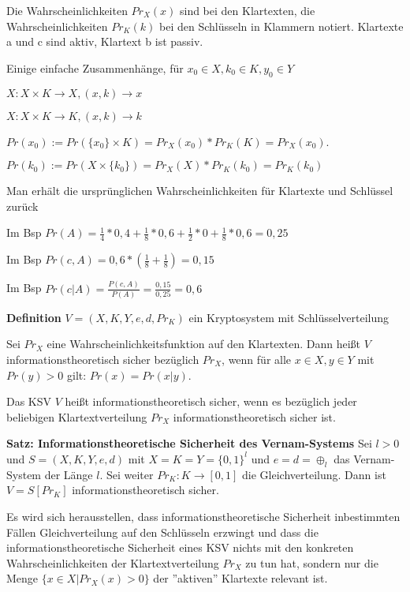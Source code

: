 \documentclass[a4paper]{article}
\begin{document}
\begin{multicols}{3}
    Die Wahrscheinlichkeiten $Pr_X(x)$ sind bei den Klartexten, die Wahrscheinlichkeiten $Pr_K(k)$ bei den Schlüsseln in Klammern notiert. Klartexte a und c sind aktiv, Klartext b ist passiv.

    Einige einfache Zusammenhänge, für $x_0\in X,k_0\in K,y_0\in Y$
    \begin{itemize*}
        \item $X: X\times K \rightarrow X, (x,k)\rightarrow x$
        \item $X: X\times K \rightarrow K, (x,k)\rightarrow k$
        \item $Pr(x_0):=Pr(\{x_0\}\times K) = Pr_X(x_0)*Pr_K(K) = Pr_X(x_0)$.
        \item $Pr(k_0):=Pr(X\times\{k_0\})=Pr_X(X)*Pr_K(k_0)=Pr_K(k_0)$
    \item Man erhält die ursprünglichen Wahrscheinlichkeiten für Klartexte und Schlüssel zurück
\item Im Bsp $Pr(A)=\frac{1}{4}*0,4+ \frac{1}{8}*0,6 +\frac{1}{2}*0 +\frac{1}{8}* 0,6=0,25$
\item Im Bsp $Pr(c,A)=0,6*(\frac{1}{8}+\frac{1}{8})=0,15$
\item Im Bsp $Pr(c|A)=\frac{P(c,A)}{P(A)}=\frac{0,15}{0,25}=0,6$
    \end{itemize*}

    \textbf{Definition} $V=(X,K,Y,e,d,Pr_K)$ ein Kryptosystem mit Schlüsselverteilung
    \begin{enumerate*}
        \item Sei $Pr_X$ eine Wahrscheinlichkeitsfunktion auf den Klartexten. Dann heißt $V$ informationstheoretisch sicher bezüglich $Pr_X$, wenn für alle $x\in X,y\in Y$ mit $Pr(y)>0$ gilt: $Pr(x) = Pr(x|y)$.
        \item Das KSV $V$ heißt informationstheoretisch sicher, wenn es bezüglich jeder beliebigen Klartextverteilung $Pr_X$ informationstheoretisch sicher ist.
    \end{enumerate*}

    \textbf{Satz: Informationstheoretische Sicherheit des Vernam-Systems} Sei $l>0$ und $S=(X,K,Y,e,d)$ mit $X=K=Y=\{0,1\}^l$ und $e=d=\oplus_l$ das Vernam-System der Länge $l$. Sei weiter $Pr_K:K\rightarrow [0,1]$ die Gleichverteilung. Dann ist $V=S[Pr_K]$ informationstheoretisch sicher.

   Es wird sich herausstellen, dass informationstheoretische Sicherheit inbestimmten Fällen Gleichverteilung auf den Schlüsseln erzwingt und dass die informationstheoretische Sicherheit eines KSV nichts mit den konkreten Wahrscheinlichkeiten der Klartextverteilung $Pr_X$ zu tun hat, sondern nur die Menge $\{x\in X|Pr_X(x)> 0\}$ der ''aktiven'' Klartexte relevant ist.


\end{multicols}
\end{document}
